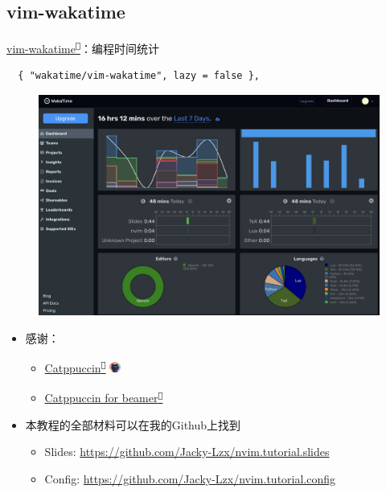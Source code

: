 \documentclass[aspectratio=169]{ctexbeamer}
\newcommand{\nerd}[1]{\texttt{#1}}
\newcommand{\link}[3][]{\href{#3}{#2\textsuperscript{\nerd{}}}}
\begin{document}
  \subsection{vim-wakatime}
    \begin{frame}[fragile]{\link{vim-wakatime}{https://wakatime.com}：编程时间统计} %

      \begin{lstlisting}
  { "wakatime/vim-wakatime", lazy = false },
      \end{lstlisting}

      \begin{figure}[H]
        \centering
        \includegraphics[width=0.6\linewidth]{./Figures/Wakatime.jpg}
      \end{figure}

    \end{frame}

    \begin{frame}
      \begin{itemize}
        \item 感谢：
          \begin{itemize}
            \item \link{Catppuccin}{https://catppuccin.com/} \includegraphics[height=10pt]{./Figures/Catppuccin_logo.png}
            \item \link{Catppuccin for beamer}{https://github.com/atticus-sullivan/beamercolortheme}
          \end{itemize}
          \vspace{0.5cm}
        \item 本教程的全部材料可以在我的Github上找到
          \begin{itemize}
            \item Slides: \url{https://github.com/Jacky-Lzx/nvim.tutorial.slides}
            \item Config: \url{https://github.com/Jacky-Lzx/nvim.tutorial.config}
          \end{itemize}
      \end{itemize}
    \end{frame}
\end{document}
